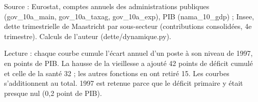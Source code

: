 Source : Eurostat, comptes annuels des administrations publiques (gov\_10a\_main, gov\_10a\_taxag, gov\_10a\_exp), PIB (nama\_10\_gdp) ; Insee, dette trimestrielle de Maastricht par sous-secteur (contributions consolidées, 4e trimestre). Calculs de l'auteur (dette/dynamique.py).\par Lecture : chaque courbe cumule l'écart annuel d'un poste à son niveau de 1997, en points de PIB. La hausse de la vieillesse a ajouté 42 points de déficit cumulé et celle de la santé 32 ; les autres fonctions en ont retiré 15. Les courbes s'additionnent au total. 1997 est retenue parce que le déficit primaire y était presque nul (0,2 point de PIB).
